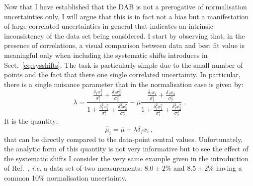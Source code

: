 \documentclass[10pt,a4paper]{article}
\begin{document}
Now that I have established that the DAB is not a prerogative of
normalisation uncertainties only, I will argue that this is in fact
not a bias but a manifestation of large correlated uncertainties in
general that indicates an intrinsic inconsistency of the data set
being considered. I start by observing that, in the presence of
correlations, a visual comparison between data and best fit value is
meaningful only when including the systematic shifts introduces in
Sect.~\ref{eq:sysshifts}. The task is particularly simple due to the
small number of points and the fact that there one single correlated
uncertainty. In particular, there is a single nuisance parameter that
in the normalisation case is given by:
\begin{equation}
\lambda=\frac{\frac{\delta_f x_1^2}{\sigma_1^2}+\frac{\delta_f x_2^2}{\sigma_2^2}}{1+\frac{\delta_f^2 x_1^2}{\sigma_1^2}+\frac{\delta_f^2 x_2^2}{\sigma_2^2}}-\overline{\mu}\frac{\frac{\delta_f x_1}{\sigma_1^2}+\frac{\delta_f x_2}{\sigma_2^2}}{1+\frac{\delta_f^2 x_1^2}{\sigma_1^2}+\frac{\delta_f^2 x_2^2}{\sigma_2^2}}\,.
\end{equation}
It is the quantity:
\begin{equation}\label{eq:shiftedvals}
\hat{\mu}_i =\overline{\mu}+\lambda \delta_fx_i\,,
\end{equation}
that can be directly compared to the data-point central
values. Unfortunately, the analytic form of this quantity is not very
informative but to see the effect of the systematic shifts I consider
the very same example given in the introduction of
Ref.~\cite{DAgostini:1993arp}, \textit{i.e.} a data set of two
measurements: $8.0\pm 2\%$ and $8.5\pm 2\%$ having a common 10\%
normalisation uncertainty.
\end{document}
